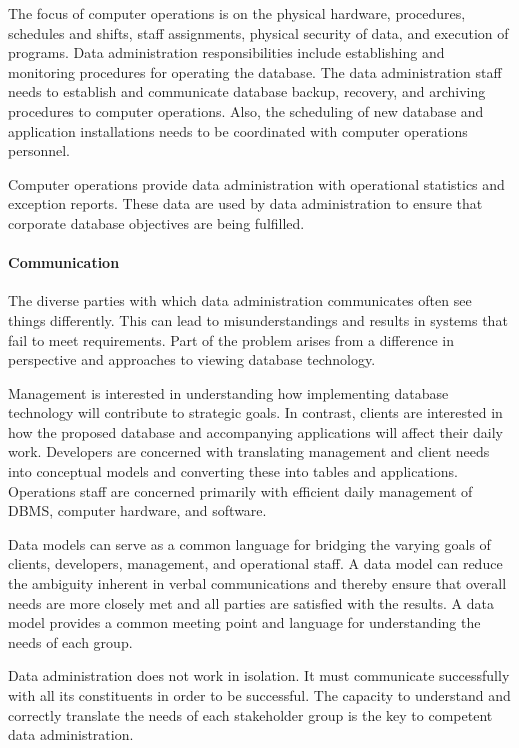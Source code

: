 \documentclass[
]{article}
\begin{document}
The focus of computer operations is on the physical hardware,
procedures, schedules and shifts, staff assignments, physical security
of data, and execution of programs. Data administration responsibilities
include establishing and monitoring procedures for operating the
database. The data administration staff needs to establish and
communicate database backup, recovery, and archiving procedures to
computer operations. Also, the scheduling of new database and
application installations needs to be coordinated with computer
operations personnel.

Computer operations provide data administration with operational
statistics and exception reports. These data are used by data
administration to ensure that corporate database objectives are being
fulfilled.

\hypertarget{communication}{%
\paragraph*{Communication}\label{communication}}

The diverse parties with which data administration communicates often
see things differently. This can lead to misunderstandings and results
in systems that fail to meet requirements. Part of the problem arises
from a difference in perspective and approaches to viewing database
technology.

Management is interested in understanding how implementing database
technology will contribute to strategic goals. In contrast, clients are
interested in how the proposed database and accompanying applications
will affect their daily work. Developers are concerned with translating
management and client needs into conceptual models and converting these
into tables and applications. Operations staff are concerned primarily
with efficient daily management of DBMS, computer hardware, and
software.

Data models can serve as a common language for bridging the varying
goals of clients, developers, management, and operational staff. A data
model can reduce the ambiguity inherent in verbal communications and
thereby ensure that overall needs are more closely met and all parties
are satisfied with the results. A data model provides a common meeting
point and language for understanding the needs of each group.

Data administration does not work in isolation. It must communicate
successfully with all its constituents in order to be successful. The
capacity to understand and correctly translate the needs of each
stakeholder group is the key to competent data administration.
\end{document}
